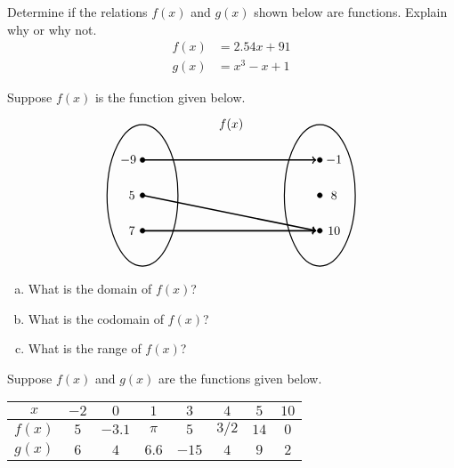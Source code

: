 \documentclass[11pt,letterpaper]{article}
\begin{document}
\prob Determine if the relations $f(x)$ and $g(x)$ shown below are functions. Explain why or why not. 
	\[
	\begin{aligned}
	f(x)&= 2.54x + 91 \\[0.3cm]
	g(x)&= x^3 - x + 1
	\end{aligned}
	\] \pspace
   

\prob Suppose $f(x)$ is the function given below.
	\[
	\begin{tikzpicture}
	\node at (2.5,2) {$f(x)$};
	\draw[line width=0.03cm] (0,0) circle (1 and 2);
	\draw[line width=0.03cm] (5,0) circle (1 and 2);
	
	\draw[fill=black] (0,1) circle (0.07);
	\draw[fill=black] (0,0) circle (0.07);
	\draw[fill=black] (0,-1) circle (0.07);
	
	\draw[fill=black] (5,1) circle (0.07);
	\draw[fill=black] (5,0) circle (0.07);
	\draw[fill=black] (5,-1) circle (0.07);
	
	\draw[line width=0.04cm,->] (0,1) -- (4.9,1);
	\draw[line width=0.04cm,->] (0,0) -- (4.9,-1);
	\draw[line width=0.04cm,->] (0,-1) -- (4.9,-1);
	
	\node at (-0.4,1) {$-9$};
	\node at (-0.3,0) {$5$};
	\node at (-0.3,-1) {$7$};
	
	\node at (5.4,1) {$-1$};
	\node at (5.4,0) {$8$};
	\node at (5.4,-1) {$10$};
	\end{tikzpicture}
	\]

\begin{enumerate}[(a)]
\item What is the domain of $f(x)$?
\item What is the codomain of $f(x)$?
\item What is the range of $f(x)$?
\end{enumerate} \pspace


\prob Suppose $f(x)$ and $g(x)$ are the functions given below. 
        \begin{table}[H]
        \centering
        \begin{tabular}{| c || c | c | c | c | c | c | c |} \hline
	$x$ & $-2$ & $0$ & $1$ & $3$ & $4$ & $5$ & $10$ \\ \hline
	$f(x)$ & $5$ & $-3.1$ & $\pi$ & $5$ & $3/2$ & $14$ & $0$ \\ \hline
	$g(x)$ & $6$ & $4$ & $6.6$ & $-15$ & $4$ & $9$ & $2$ \\ \hline
        \end{tabular}
        \end{table}
\end{document}
